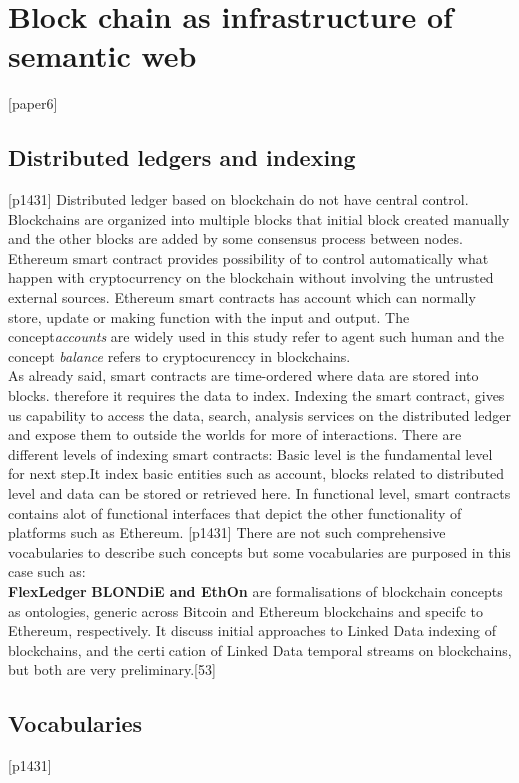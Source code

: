 \chapter{Block chain as infrastructure of semantic web}[paper6]



\section{Distributed ledgers and indexing}[p1431]
Distributed ledger based on blockchain do not have central control. Blockchains are organized into multiple blocks that initial block created manually and the other blocks are added by some consensus process between nodes.
Ethereum smart contract provides possibility of to control automatically what happen with cryptocurrency on the blockchain without involving the untrusted external sources. Ethereum smart  contracts has account which can normally store, update or making function with the input and output.
The concept\textit{accounts} are widely used in this study refer to agent such human and the concept \textit{balance} refers to cryptocurenccy in blockchains. \\ 
As already said, smart contracts are time-ordered where data are stored into blocks. therefore it requires the data to index. Indexing the smart contract, gives us capability to access the data, search, analysis services on the distributed ledger and expose them to outside the worlds for more of interactions.
There are different levels of indexing smart contracts: Basic level is the fundamental level for next step.It index basic entities such as account, blocks related to distributed level and data can be stored or retrieved here. In functional level, smart contracts contains alot of functional interfaces that depict the other functionality of platforms such as Ethereum. [p1431]
 There are not such comprehensive vocabularies to describe such concepts but some vocabularies are purposed in this case such as: 
\\
\textbf{FlexLedger}   
\textbf{BLONDiE and EthOn}  are formalisations of blockchain concepts
as ontologies, generic across Bitcoin and Ethereum blockchains and specifc to
Ethereum, respectively. It discuss initial approaches to Linked Data
indexing of blockchains, and the certication of Linked Data temporal streams
on blockchains, but both are very preliminary.[53]
  
 \section{Vocabularies}[p1431]
